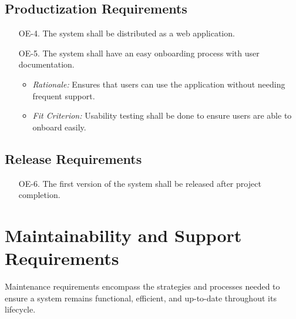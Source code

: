 \documentclass[12pt]{article}
\begin{document}
\subsection{Productization Requirements}
\begin{enumerate}
  \item[OE-4.] The system shall be distributed as a web application.
  \item[OE-5.] The system shall have an easy onboarding process with user documentation.
  \begin{itemize}
    \item \textit{Rationale:} Ensures that users can use the application without
    needing frequent support.
    \item \textit{Fit Criterion:} Usability testing shall be done to ensure
    users are able to onboard easily.
  \end{itemize}
\end{enumerate}

\subsection{Release Requirements}
\begin{enumerate}
  \item[OE-6.] The first version of the system shall be released after project completion.
\end{enumerate}

\section{Maintainability and Support Requirements}
Maintenance requirements encompass the strategies and processes needed to ensure
a system remains functional, efficient, and up-to-date throughout its lifecycle.
\end{document}
